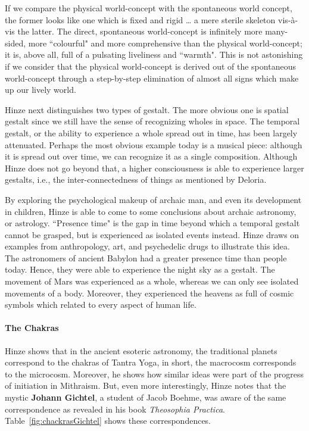 \begin{quotex}
If we compare the physical world-concept with the spontaneous world concept, the former looks like one which is fixed and rigid … a mere sterile skeleton vis-à-vis the latter. The direct, spontaneous world-concept is infinitely more many-sided, more ``colourful" and more comprehensive than the physical world-concept; it is, above all, full of a pulsating liveliness and ``warmth". This is not astonishing if we consider that the physical world-concept is derived out of the spontaneous world-concept through a step-by-step elimination of almost all signs which make up our lively world. 

\end{quotex}
Hinze next distinguishes two types of gestalt. The more obvious one is spatial gestalt since we still have the sense of recognizing wholes in space. The temporal gestalt, or the ability to experience a whole spread out in time, has been largely attenuated. Perhaps the most obvious example today is a musical piece: although it is spread out over time, we can recognize it as a single composition. Although Hinze does not go beyond that, a higher consciousness is able to experience larger gestalts, i.e., the inter-connectedness of things as mentioned by Deloria.

By exploring the psychological makeup of archaic man, and even its development in children, Hinze is able to come to some conclusions about archaic astronomy, or astrology. ``Presence time" is the gap in time beyond which a temporal gestalt cannot be grasped, but is experienced as isolated events instead. Hinze draws on examples from anthropology, art, and psychedelic drugs to illustrate this idea. The astronomers of ancient Babylon had a greater presence time than people today. Hence, they were able to experience the night sky as a gestalt. The movement of Mars was experienced as a whole, whereas we can only see isolated movements of a body. Moreover, they experienced the heavens as full of cosmic symbols which related to every aspect of human life.

\paragraph{The Chakras}

Hinze shows that in the ancient esoteric astronomy, the traditional planets correspond to the chakras of Tantra Yoga, in short, the macrocosm corresponds to the microcosm. Moreover, he shows how similar ideas were part of the progress of initiation in Mithraism. But, even more interestingly, Hinze notes that the mystic \textbf{Johann Gichtel}, a student of Jacob Boehme, was aware of the same correspondence as revealed in his book \emph{Theosophia Practica}. Table~\ref{fig:chackrasGichtel} shows these correspondences.

